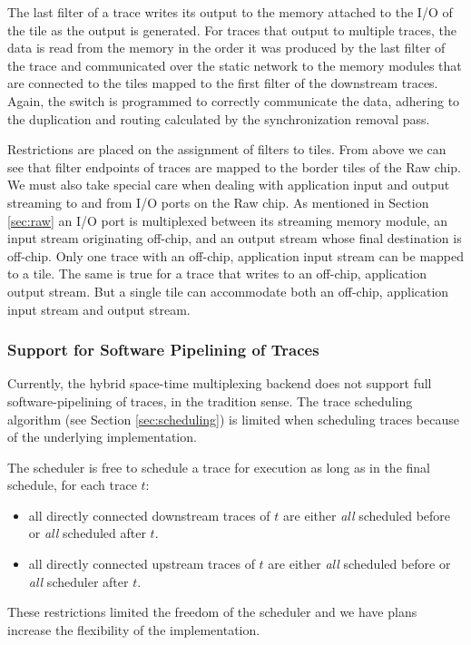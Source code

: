 The last filter of a trace writes its output to the memory attached to
the I/O of the tile as the output is generated. For traces that output
to multiple traces, the data is read from the memory in the order it
was produced by the last filter of the trace and communicated over the
static network to the memory modules that are connected to the tiles
mapped to the first filter of the downstream traces. Again, the switch
is programmed to correctly communicate the data, adhering to the
duplication and routing calculated by the synchronization removal
pass.

Restrictions are placed on the assignment of filters to tiles. From
above we can see that filter endpoints of traces are mapped to the
border tiles of the Raw chip. We must also take special care when
dealing with application input and output streaming to and from I/O
ports on the Raw chip.  As mentioned in Section \ref{sec:raw} an I/O
port is multiplexed between its streaming memory module, an input
stream originating off-chip, and an output stream whose final
destination is off-chip.  Only one trace with an off-chip, application
input stream can be mapped to a tile.  The same is true for a trace
that writes to an off-chip, application output stream.  But a single
tile can accommodate both an off-chip, application input stream and
output stream.

\subsubsection{Support for Software Pipelining of Traces}
\label{sec:softpipe}
Currently, the hybrid space-time multiplexing backend does not support
full software-pipelining of traces, in the tradition sense.  The trace
scheduling algorithm (see Section \ref{sec:scheduling}) is limited
when scheduling traces because of the underlying implementation.

The scheduler is free to schedule a trace for execution as long as in
the final schedule, for each trace $t$:
\begin{itemize}
\item all directly connected downstream traces of $t$ are either {\it all}
scheduled before or {\it all} scheduled after $t$.
\item all directly connected upstream traces of $t$ are either {\it all}
scheduled before or {\it all} scheduler after $t$.
\end{itemize}
These restrictions limited the freedom of the scheduler and we have
plans increase the flexibility of the implementation.

